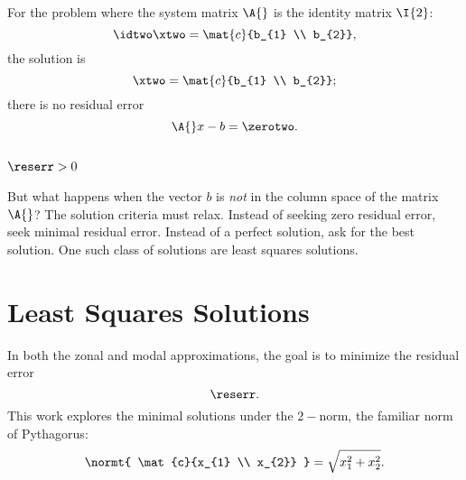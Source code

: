 For the problem where the system matrix $\A{}$ is the identity matrix $\I{2}$:
  \begin{equation*}   %
      \idtwo \xtwo = \mat{c}{b_{1} \\ b_{2}},
  \end{equation*}
the solution is
  \begin{equation*}   %
      \xtwo = \mat{c}{b_{1} \\ b_{2}} ;
  \end{equation*}
there is no residual error 
  \begin{equation*}   %
      \A{} x - b = \zerotwo .
  \end{equation*}

\subsection{\label{ssec:no exact soln}$\reserr > 0$}  %
But what happens when the vector $b$ is \emph{not} in the column space of the matrix $\A{}$? The solution criteria must relax. Instead of seeking zero residual error, seek minimal residual error. Instead of a perfect solution, ask for the best solution. One such class of solutions are least squares solutions.

\section{\label{sec:lss}Least Squares Solutions}  %
In both the zonal and modal approximations, the goal is to minimize the residual error
  \begin{equation*}   %
      \reserr.
  \end{equation*}
This work explores the minimal solutions under the $2-$norm, the familiar norm of Pythagorus:
  \begin{equation*}   %
      \normt{ \mat{c}{x_{1} \\ x_{2}} } = \sqrt{x_{1}^{2} + x_{2}^{2}}.
  \end{equation*}

